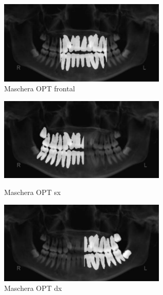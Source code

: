 \documentclass[12pt,a4paper,openright,twoside]{book}
\begin{document}
\begin{figure}[H]
    \centering
    \includegraphics[width=8cm]{figures/optfrontal.pdf}
    \caption{Maschera OPT frontal}
    \label{fig:mascherafrontal}
\end{figure}
\begin{figure}[H]
    \centering
    \begin{minipage}{0.45\textwidth}
	\centering
    	\includegraphics[width=8cm]{figures/optsx.pdf}
    	\caption{Maschera OPT sx}
    	\label{lab:Maschera sx}
    \end{minipage}\hfill
    \begin{minipage}{0.45\textwidth}
    	\centering
    	\includegraphics[width=8cm]{figures/optdx.pdf}
    	\caption{Maschera OPT dx}
    	\label{lab:Maschera dx}
    \end{minipage}\hfill
\end{figure}
\end{document}
